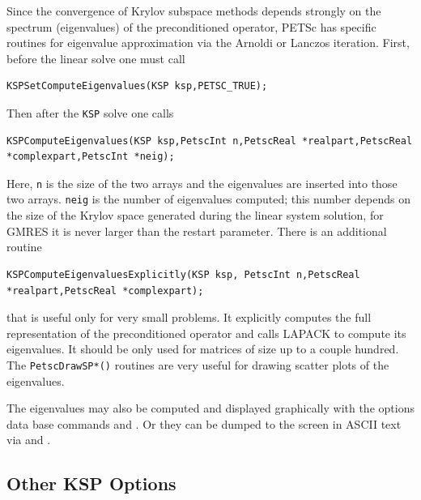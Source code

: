 Since the convergence of Krylov subspace methods depends strongly on
the spectrum (eigenvalues) of the preconditioned operator, PETSc has specific
routines for eigenvalue approximation via the Arnoldi or Lanczos iteration.
First, before the linear solve one must call
\begin{lstlisting}
KSPSetComputeEigenvalues(KSP ksp,PETSC_TRUE);
\end{lstlisting}
Then after the \lstinline{KSP} solve one calls
\begin{lstlisting}
KSPComputeEigenvalues(KSP ksp,PetscInt n,PetscReal *realpart,PetscReal *complexpart,PetscInt *neig);
\end{lstlisting}
Here, \lstinline{n} is the size of the two arrays and the eigenvalues are
inserted into those two arrays. \lstinline{neig} is the number of eigenvalues computed;
this number depends on the size of the Krylov space generated during the
linear system solution, for GMRES it is never larger than the restart parameter.
There is an additional routine
\begin{lstlisting}
KSPComputeEigenvaluesExplicitly(KSP ksp, PetscInt n,PetscReal *realpart,PetscReal *complexpart);
\end{lstlisting}
that is useful only for very small problems. It explicitly computes the
full representation of the preconditioned operator and calls LAPACK to
compute its eigenvalues. It should be only used for matrices of size up to
a couple hundred.  The \lstinline{PetscDrawSP*()} routines are very useful for
drawing scatter plots of the eigenvalues. 

The eigenvalues may also be computed and displayed graphically with the options
data base commands  and .   
Or they can be dumped to the screen in ASCII text via
 and .
 
   

\subsection{Other KSP Options}

